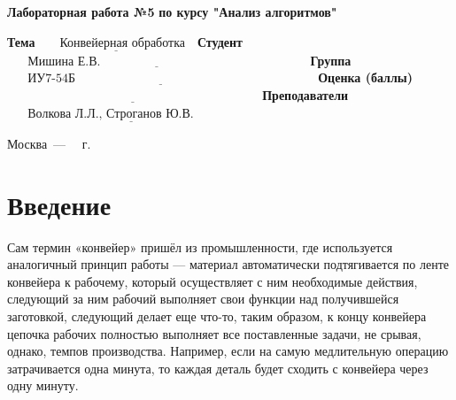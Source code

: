 \documentclass[12pt, a4paper]{report}
\begin{document}
\begin{titlepage}
		
		\begin{center}
			\Large\textbf{Лабораторная работа №5}\newline
			\Large\textbf{по курсу "Анализ алгоритмов"}\newline
		\end{center}
	
		\noindent\textbf{Тема} $\underline{\text{~~~~~Конвейерная обработка~~}}$\newline\newline\newline
		\noindent\textbf{Студент} $\underline{\text{~~~~~Мишина Е.В.~~~~~~~~~~~~~~~~~~~~~~~~~~~~~~~~~~~~~~~~~~~~~~~~~~}}$\newline\newline
		\noindent\textbf{Группа} $\underline{\text{~~~~~ИУ7-54Б~~~~~~~~~~~~~~~~~~~~~~~~~~~~~~~~~~~~~~~~~~~~~~~~~~~~~~~~~~}}$\newline\newline
		\noindent\textbf{Оценка (баллы)} $\underline{\text{~~~~~~~~~~~~~~~~~~~~~~~~~~~~~~~~~~~~~~~~~~~~~~~~~~~~~~~~~~~~~}}$\newline\newline
		\noindent\textbf{Преподаватели} $\underline{\text{~~~~~Волкова Л.Л., Строганов Ю.В.~~~~~~~~~~~~~~~}}$\newline
		
		\begin{center}
			\vfill
			Москва~---~\the\year
			~г.
		\end{center}
	\restoregeometry
	\end{titlepage}
	
	\tableofcontents

	\chapter*{Введение}
	\hspace{0.5cm}Сам термин «конвейер» пришёл из промышленности, где используется аналогичный принцип работы — материал автоматически подтягивается по ленте конвейера к рабочему, который осуществляет с ним необходимые действия, следующий за ним рабочий выполняет свои функции над получившейся заготовкой, следующий делает еще что-то, таким образом, к концу конвейера цепочка рабочих полностью выполняет все поставленные задачи, не срывая, однако, темпов производства. Например, если на самую медлительную операцию затрачивается одна минута, то каждая деталь будет сходить с конвейера через одну минуту.
	
\end{document}
